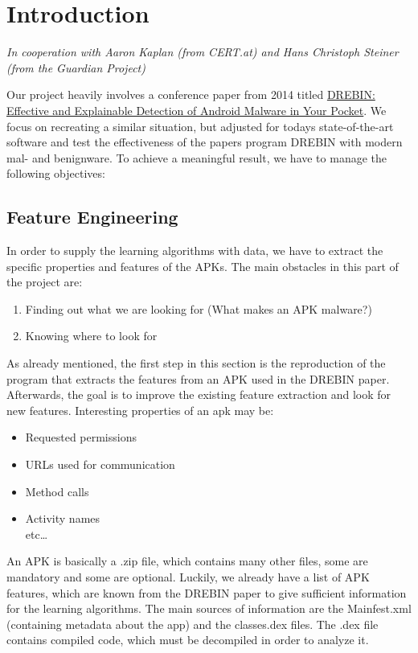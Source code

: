 \section{Introduction}
\emph{In cooperation with Aaron Kaplan (from CERT.at) and Hans Christoph
	Steiner (from the Guardian Project)}

Our project heavily involves a conference paper from 2014 titled
\href{https://www.tu-braunschweig.de/Medien-DB/sec/pubs/2014-ndss.pdf}{DREBIN:
	Effective and Explainable Detection of Android Malware in Your Pocket}.
We focus on recreating a similar situation, but adjusted for todays
state-of-the-art software and test the effectiveness of the papers
program DREBIN with modern mal- and benignware. To achieve a meaningful
result, we have to manage the following objectives:

\subsection{Feature Engineering}\label{feature-engineering}

In order to supply the learning algorithms with data, we have to extract
the specific properties and features of the APKs. The main obstacles in
this part of the project are:

\begin{enumerate}
	\def\labelenumi{\arabic{enumi}.}
	\item
	Finding out what we are looking for (What makes an APK malware?)
	\item
	Knowing where to look for
\end{enumerate}

As already mentioned, the first step in this section is the reproduction
of the program that extracts the features from an APK used in the DREBIN
paper. Afterwards, the goal is to improve the existing feature
extraction and look for new features. Interesting properties of an apk
may be:

\begin{itemize}
	\item
	Requested permissions
	\item
	URLs used for communication
	\item
	Method calls
	\item
	Activity names\\
	etc\ldots{}
\end{itemize}

An APK is basically a .zip file, which contains many other files, some
are mandatory and some are optional. Luckily, we already have a list of
APK features, which are known from the DREBIN paper to give sufficient
information for the learning algorithms. The main sources of information
are the Mainfest.xml (containing metadata about the app) and the
classes.dex files. The .dex file contains compiled code, which must be
decompiled in order to analyze it.

